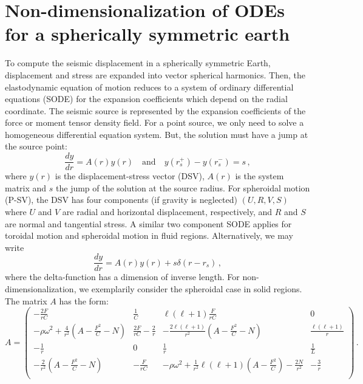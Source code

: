 \documentclass[11pt,a4paper]{article}
\begin{document}
\section{Non-dimensionalization of ODEs for a spherically symmetric earth}
%
To compute the seismic displacement in a spherically symmetric Earth, displacement and stress 
are expanded into vector spherical harmonics. Then, the elastodynamic equation of motion reduces 
to a system of ordinary differential equations (SODE) for the expansion coefficients which 
depend on the radial coordinate. The seismic source is represented by the expansion coefficients 
of the force or moment tensor density field. For a point source, we only need to solve a homogeneous
differential equation system. But, the solution must have a jump at the source point:
%
\begin{equation}
\frac{dy}{dr}=A(r)y(r) \quad\mbox{and}\quad y(r_s^+)-y(r_s^-) = s \,,
\end{equation}
%
where $y(r)$ is the displacement-stress vector (DSV), $A(r)$ is the system matrix and $s$ the jump
of the solution at the source radius. For spheroidal motion (P-SV), the DSV has four components 
(if gravity is neglected) $(U,R,V,S)$ where $U$ and $V$ are radial and horizontal displacement, 
respectively, and $R$ and $S$ are normal and tangential stress. A similar two component SODE 
applies for toroidal motion and spheroidal motion in fluid regions. Alternatively, we may write
%
\begin{equation}
\frac{dy}{dr}=A(r)y(r)+s\delta(r-r_s) \,,
\end{equation}
%
where the delta-function has a dimension of inverse length.
%
For non-dimensionalization, we exemplarily consider the spheroidal case in solid regions. 
The matrix $A$ has the form:
%
\begin{equation}
A = \left(\begin{array}{cccc}
-\frac{2F}{rC} & \frac{1}{C} & \ell(\ell+1)\frac{F}{rC} & 0 \\
-\rho\omega^2+\frac{4}{r^2}(A-\frac{F^2}{C}-N) & \frac{2F}{rC}-\frac{2}{r} & -\frac{2\ell(\ell+1)}{r^2}(A-\frac{F^2}{C}-N) & \frac{\ell(\ell+1)}{r} \\
-\frac{1}{r} & 0 & \frac{1}{r} & \frac{1}{L} \\
-\frac{2}{r^2}(A-\frac{F^2}{C}-N) & -\frac{F}{rC} & -\rho\omega^2+\frac{1}{r^2}\ell(\ell+1)(A-\frac{F^2}{C})-\frac{2N}{r^2} & -\frac{3}{r} \\
\end{array}\right) \,.
\end{equation}
\end{document}
